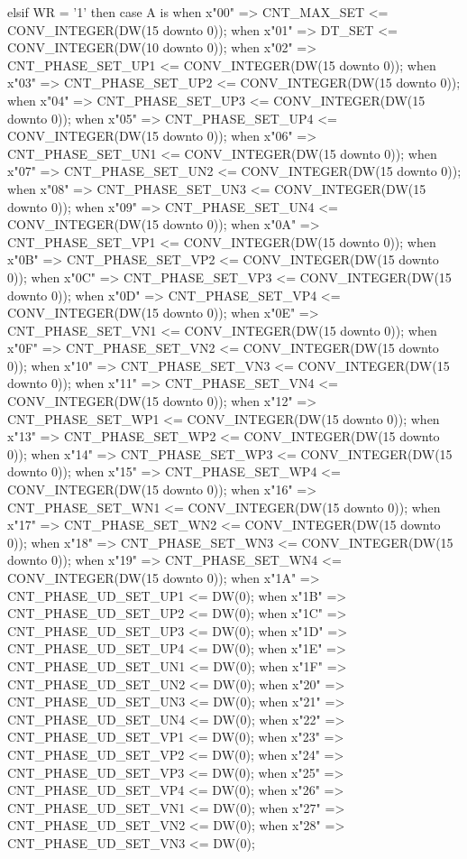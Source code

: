 \begin{mylisting}[language=VHDL,caption=ゲート信号出力モジュール,label=MMC_PWM_GEN_module_VHDL]
			elsif WR = '1' then
				case A is
					when x"00"	=>	CNT_MAX_SET			<= CONV_INTEGER(DW(15 downto 0));
					when x"01"	=>	DT_SET				<= CONV_INTEGER(DW(10 downto 0));
					when x"02"	=>	CNT_PHASE_SET_UP1	<= CONV_INTEGER(DW(15 downto 0));
					when x"03"	=>	CNT_PHASE_SET_UP2	<= CONV_INTEGER(DW(15 downto 0));
					when x"04"	=>	CNT_PHASE_SET_UP3	<= CONV_INTEGER(DW(15 downto 0));
					when x"05"	=>	CNT_PHASE_SET_UP4	<= CONV_INTEGER(DW(15 downto 0));
					when x"06"	=>	CNT_PHASE_SET_UN1	<= CONV_INTEGER(DW(15 downto 0));
					when x"07"	=>	CNT_PHASE_SET_UN2	<= CONV_INTEGER(DW(15 downto 0));
					when x"08"	=>	CNT_PHASE_SET_UN3	<= CONV_INTEGER(DW(15 downto 0));
					when x"09"	=>	CNT_PHASE_SET_UN4	<= CONV_INTEGER(DW(15 downto 0));
					when x"0A"	=>	CNT_PHASE_SET_VP1	<= CONV_INTEGER(DW(15 downto 0));
					when x"0B"	=>	CNT_PHASE_SET_VP2	<= CONV_INTEGER(DW(15 downto 0));
					when x"0C"	=>	CNT_PHASE_SET_VP3	<= CONV_INTEGER(DW(15 downto 0));
					when x"0D"	=>	CNT_PHASE_SET_VP4	<= CONV_INTEGER(DW(15 downto 0));
					when x"0E"	=>	CNT_PHASE_SET_VN1	<= CONV_INTEGER(DW(15 downto 0));
					when x"0F"	=>	CNT_PHASE_SET_VN2	<= CONV_INTEGER(DW(15 downto 0));
					when x"10"	=>	CNT_PHASE_SET_VN3	<= CONV_INTEGER(DW(15 downto 0));
					when x"11"	=>	CNT_PHASE_SET_VN4	<= CONV_INTEGER(DW(15 downto 0));
					when x"12"	=>	CNT_PHASE_SET_WP1	<= CONV_INTEGER(DW(15 downto 0));
					when x"13"	=>	CNT_PHASE_SET_WP2	<= CONV_INTEGER(DW(15 downto 0));
					when x"14"	=>	CNT_PHASE_SET_WP3	<= CONV_INTEGER(DW(15 downto 0));
					when x"15"	=>	CNT_PHASE_SET_WP4	<= CONV_INTEGER(DW(15 downto 0));
					when x"16"	=>	CNT_PHASE_SET_WN1	<= CONV_INTEGER(DW(15 downto 0));
					when x"17"	=>	CNT_PHASE_SET_WN2	<= CONV_INTEGER(DW(15 downto 0));
					when x"18"	=>	CNT_PHASE_SET_WN3	<= CONV_INTEGER(DW(15 downto 0));
					when x"19"	=>	CNT_PHASE_SET_WN4	<= CONV_INTEGER(DW(15 downto 0));
					when x"1A"	=>	CNT_PHASE_UD_SET_UP1	<= DW(0);
					when x"1B"	=>	CNT_PHASE_UD_SET_UP2	<= DW(0);
					when x"1C"	=>	CNT_PHASE_UD_SET_UP3	<= DW(0);
					when x"1D"	=>	CNT_PHASE_UD_SET_UP4	<= DW(0);
					when x"1E"	=>	CNT_PHASE_UD_SET_UN1	<= DW(0);
					when x"1F"	=>	CNT_PHASE_UD_SET_UN2	<= DW(0);
					when x"20"	=>	CNT_PHASE_UD_SET_UN3	<= DW(0);
					when x"21"	=>	CNT_PHASE_UD_SET_UN4	<= DW(0);
					when x"22"	=>	CNT_PHASE_UD_SET_VP1	<= DW(0);
					when x"23"	=>	CNT_PHASE_UD_SET_VP2	<= DW(0);
					when x"24"	=>	CNT_PHASE_UD_SET_VP3	<= DW(0);
					when x"25"	=>	CNT_PHASE_UD_SET_VP4	<= DW(0);
					when x"26"	=>	CNT_PHASE_UD_SET_VN1	<= DW(0);
					when x"27"	=>	CNT_PHASE_UD_SET_VN2	<= DW(0);
					when x"28"	=>	CNT_PHASE_UD_SET_VN3	<= DW(0);

\end{mylisting}
